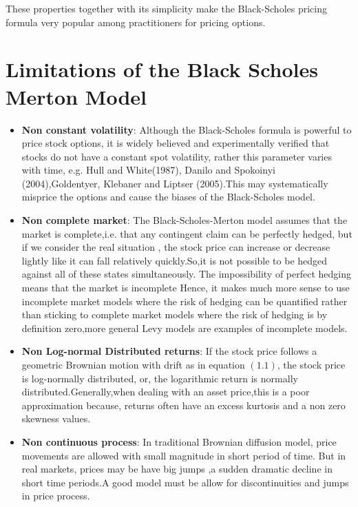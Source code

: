 \documentclass[12pt]{report}
\begin{document}
These properties together with its simplicity make the Black-Scholes pricing formula very popular among practitioners for pricing options. 
\section{ Limitations of the Black Scholes Merton Model }
\begin{itemize}
\item \textbf{Non constant volatility}:
Although the Black-Scholes formula is powerful to price stock options, it is widely believed and experimentally verified  that stocks do not have a constant spot volatility, rather this parameter varies with time, e.g. Hull and White(1987), Danilo and Spokoinyi (2004),Goldentyer, Klebaner and Liptser (2005).This may systematically misprice the options and cause the biases of the Black-Scholes model. 


\item \textbf{Non complete market}:
The Black-Scholes-Merton  model assumes that the market is complete,i.e.  that any contingent claim can be perfectly hedged, but if we consider the real situation , the stock price can increase or decrease
lightly like it can fall relatively quickly.So,it is not possible to be hedged against all of these states
simultaneously. The impossibility of perfect hedging means that the market is incomplete Hence, it makes much more sense to use incomplete market models where the risk of hedging can be quantified rather than sticking to complete market models where the risk of hedging is by definition zero,more general Levy models  are examples of incomplete models. 

\item \textbf{Non Log-normal Distributed returns}: If the stock price follows a geometric Brownian motion with drift  as in equation $(1.1)$, the stock price is log-normally distributed, or, the logarithmic return is normally
distributed.Generally,when dealing with an asset price,this is a poor approximation because, returns often have an excess kurtosis and a non zero skewness values.

\item \textbf{Non continuous process}:
In traditional Brownian diffusion model, price movements are allowed with  small magnitude in short period of time. But in real markets, prices may be have big jumps ,a sudden dramatic decline in short time periods.A good model must be allow for discontinuities and jumps in price process.

\end{itemize}
\end{document}
